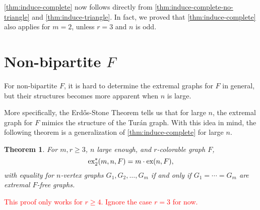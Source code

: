\documentclass[12pt]{report}
\newtheorem{theorem}{Theorem}[chapter]
\newtheorem{corollary}[theorem]{Corollary}
\newcommand*{\ex}{\textnormal{ex}}
\newcommand*{\dex}{\textnormal{ex}_2}
\begin{document}
\cref{thm:induce-complete} now follows directly from \cref{thm:induce-complete-no-triangle} and \cref{thm:induce-triangle}. In fact, we proved that \cref{thm:induce-complete} also applies for $m = 2$, unless $r = 3$ and $n$ is odd.



\section{Non-bipartite $F$}

For non-bipartite $F$, it is hard to determine the extremal graphs for $F$ in general, but their structures becomes more apparent when $n$ is large. 

More specifically, the Erdős-Stone Theorem tells us that for large $n$, the extremal graph for $F$ mimics the structure of the Turán graph. With this idea in mind, the following theorem is a generalization of \cref{thm:induce-complete} for large $n$.

\begin{theorem}
  For $m, r \geq 3$, $n$ large enough, and $r$-colorable graph $F$, 
  \[
    \dex^*(m, n, F) = m \cdot \ex(n, F),
  \]
  with equality for $n$-vertex graphs $G_1, G_2, \ldots, G_m$ if and only if $G_1 = \cdots = G_m$ are extremal $F$-free graphs.

\end{theorem}

\textcolor{red}{This proof only works for $r \geq 4$. Ignore the case $r = 3$ for now.}
\end{document}
